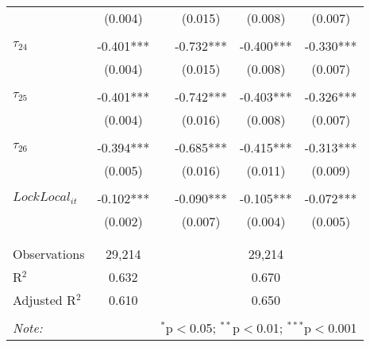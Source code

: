 \begin{tabular}{@{\extracolsep{-0pt}}lccccc}
                &  (0.004)  &&  (0.015)  &  (0.008)  &  (0.007)  \\
                &           &&           &           &           \\[-2.1ex]
$\tau_{24}$     & -0.401*** && -0.732*** & -0.400*** & -0.330*** \\
                &  (0.004)  &&  (0.015)  &  (0.008)  &  (0.007)  \\
                &           &&           &           &           \\[-2.1ex]
$\tau_{25}$     & -0.401*** && -0.742*** & -0.403*** & -0.326*** \\
                &  (0.004)  &&  (0.016)  &  (0.008)  &  (0.007)  \\
                &           &&           &           &           \\[-2.1ex]
$\tau_{26}$     & -0.394*** && -0.685*** & -0.415*** & -0.313*** \\
                &  (0.005)  &&  (0.016)  &  (0.011)  &  (0.009)  \\
                &           &&           &           &           \\[-1.ex]
$LockLocal_{it}$ & -0.102*** && -0.090*** & -0.105*** & -0.072*** \\
                 &  (0.002)  &&  (0.007)  &  (0.004)  &  (0.005)  \\
                 &           &&           &           &           \\[-2.1ex]
\hline \\[-1.8ex] 
Observations     & 29,214 && \multicolumn{3}{c}{29,214} \\ 
R$^{2}$          &  0.632 && \multicolumn{3}{c}{0.670 } \\ 
Adjusted R$^{2}$ &  0.610 && \multicolumn{3}{c}{0.650 } \\ 
\hline 
\hline \\[-1.8ex] 
\textit{Note:}  & \multicolumn{5}{r}{$^{*}$p$<$0.05; $^{**}$p$<$0.01; $^{***}$p$<$0.001} \\ 
\end{tabular} 